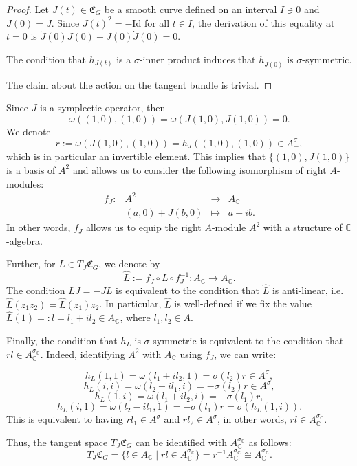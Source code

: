 \documentclass[oneside,11pt]{amsart}
\theoremstyle{definition}
\theoremstyle{remark}
\numberwithin{thm}{section}
\numberwithin{equation}{section}
\begin{document}
\begin{proof}
    Let $J(t)\in\mathfrak{C}_G$ be a smooth curve defined on an interval $I\ni 0$ and $J(0)=J$. Since $J(t)^2=-\mathrm{Id}$ for all $t\in I$, the derivation of this equality at $t=0$ is $\dot J(0) J(0)+ J(0)\dot J(0)=0$.
  
    \noindent The condition that $h_{J(t)}$ is a $\sigma$-inner product induces that $h_{\dot J(0)}$ is $\sigma$-symmetric.

    \noindent The claim about the action on the tangent bundle is trivial. 
\end{proof}

Since $J$ is a symplectic operator, then 
\[\omega((1,0),(1,0))=\omega(J(1,0),J(1,0))=0.\] 
We denote 
\[r:=\omega(J(1,0),(1,0))=h_J((1,0),(1,0))\in A^\sigma_+,\] which is in particular an invertible element. This implies that $\{(1,0),J(1,0)\}$ is a basis of $A^2$ and allows us to consider the following isomorphism of right $A$-modules:
\[\begin{matrix}
    f_J\colon & A^2 & \to & A_\mathbb C\\
           & (a,0)+J(b,0) & \mapsto & a+ib.
\end{matrix}\]
In other words, $f_J$ allows us to equip the right $A$-module $A^2$ with a structure of $\mathbb C$-algebra.

Further, for $L\in T_J\mathfrak{C}_G$, we denote by 
$$\hat L:= f_J\circ L \circ f_J^{-1}\colon A_\mathbb C\to A_\mathbb C.$$ 
The condition $LJ=-JL$ is equivalent to the condition that $\hat L$ is anti-linear, i.e. $\hat L(z_1z_2)=\hat L(z_1)\bar z_2$. In particular, $\hat L$ is well-defined if we fix the value $\hat L(1)=:l=l_1+il_2\in A_\mathbb C$, where $l_1,l_2\in A$.

Finally, the condition that $h_L$ is $\sigma$-symmetric is equivalent to the condition that $rl\in A_\mathbb C^{\sigma_\mathbb{C}}$. Indeed, identifying $A^2$ with $A_\mathbb C$ using $f_J$, we can write:

$$h_L(1,1)=\omega(l_1+il_2,1)=\sigma(l_2)r\in A^\sigma,$$
$$h_L(i,i)=\omega(l_2-il_1,i)=-\sigma(l_2)r\in A^\sigma,$$
$$h_L(1,i)=\omega(l_1+il_2,i)=-\sigma(l_1)r,$$
$$h_L(i,1)=\omega(l_2-il_1,1)=-\sigma(l_1)r=\sigma(h_L(1,i)).$$
This is equivalent to having $rl_1\in A^\sigma$ and $rl_2\in A^\sigma$, in other words, $rl\in A^{\sigma_{\mathbb C}}_\mathbb C$.


Thus, the tangent space $T_J\mathfrak{C}_G$ can be identified with $A_\mathbb C^{\sigma_\mathbb C}$ as follows:
\begin{equation}\label{tangent_complex_simplified}
T_J\mathfrak{C}_G=\{l\in A_\mathbb C\mid rl\in A_\mathbb{C}^{\sigma_\mathbb C}\}=r^{-1}A_\mathbb{C}^{\sigma_\mathbb C}\cong A_\mathbb{C}^{\sigma_\mathbb C}.
\end{equation}
\end{document}
